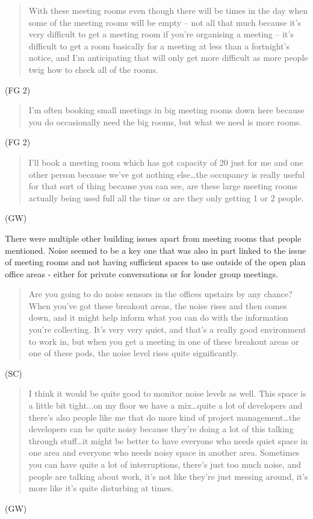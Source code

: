 \begin{quote}With these meeting rooms even though there will be times in the day
when some of the meeting rooms will be empty – not all that much
because it’s very difficult to get a meeting room if you’re organising
a meeting – it’s difficult to get a room basically for a meeting at
less than a fortnight’s notice, and I’m anticipating that will only
get more difficult as more people twig how to check all of the rooms.\end{quote}
(FG 2)

\begin{quote}I’m often booking small meetings in big meeting rooms down here
because you do occasionally need the big rooms, but what we need is
more rooms.\end{quote} (FG 2)

\begin{quote}I’ll book a meeting room which has got capacity of 20 just for me and
one other person because we’ve got nothing else…the occupancy is
really useful for that sort of thing because you can see, are these
large meeting rooms actually being used full all the time or are they
only getting 1 or 2 people.\end{quote} (GW)

There were multiple other building issues apart from meeting rooms
that people mentioned. Noise seemed to be a key one that was also in
part linked to the issue of meeting rooms and not having sufficient
spaces to use outside of the open plan office areas - either for
private conversations or for louder group meetings.

\begin{quote}Are you going to do noise sensors in the offices upstairs by any
chance? When you’ve got these breakout areas, the noise rises and then
comes down, and it might help inform what you can do with the
information you’re collecting. It’s very very quiet, and that’s a
really good environment to work in, but when you get a meeting in one
of these breakout areas or one of these pods, the noise level rises
quite significantly.\end{quote} (SC)

\begin{quote}I think it would be quite good to monitor noise levels as well. This
space is a little bit tight...on my floor we have a mix…quite a lot of
developers and there’s also people like me that do more kind of
project management…the developers can be quite noisy because they’re
doing a lot of this talking through stuff…it might be better to have
everyone who needs quiet space in one area and everyone who needs
noisy space in another area. Sometimes you can have quite a lot of
interruptions, there’s just too much noise, and people are talking
about work, it’s not like they’re just messing around, it’s more like
it’s quite disturbing at times.\end{quote} (GW)

